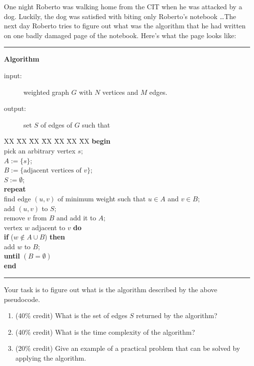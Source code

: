 One night Roberto was walking home from the CIT when he was attacked by
a dog.  Luckily, the dog was satisfied with biting only Roberto's
notebook \ldots  The next day Roberto tries to figure out what was the
algorithm that he had written on one badly damaged page of the
notebook.  Here's what the page looks like:

\bigskip
\noindent
\hrule
\medskip
\noindent
{\bf Algorithm}
	{}
%
\begin{description}
%
\item[input:]  weighted graph $G$ with $N$ vertices and $M$ edges.
%
\item[output:]  set $S$ of edges of $G$ such that
	{}
%
\end{description}

\begin{tabbing}
XX \=  XX \=  XX \=  XX \=  XX \=  XX \=  XX  \kill
      \> {\bf begin} 					\\
      \>        \>  pick an arbitrary vertex $s$;		\\
      \>        \>  $A := \{ s \}$;				\\
      \>        \>  $B := \{\mbox{adjacent vertices of $v$}\}$;	\\
      \>	  \>  $S := \emptyset$;				\\
      \>        \> {\bf repeat} \\
      \>        \>\>  find edge $(u,v)$ of minimum weight such that
		$u \in  A$ and $v \in  B$;\\
      \>        \>\>  add $(u,v)$ to $S$; \\
      \>        \>\>  remove $v$ from $B$ and add it to $A$;\\
      \>        \>   vertex $w$ adjacent to $v$ {\bf do}\\
      \>        \>      \>  \> {\bf if} ($w \not\in  A \cup  B$) {\bf then} \\
      \>        \>      \>  \>        \>  add $w$ to $B$; \\
      \>        \> {\bf until} $(B = \emptyset)$  \\
      \> {\bf end }					\\
%
   \>
	{ }
\end{tabbing}
\noindent
\hrule
\bigskip

Your task is to figure out what is the algorithm described by the
above pseudocode.

\begin{enumerate}

\item    (40\%  credit) What is the set of edges $S$ returned by the
algorithm?

\item    (40\%  credit) What is the time complexity of the algorithm?

\item    (20\%  credit) Give an example of a practical problem that can be
solved by applying the algorithm.

\end{enumerate}

